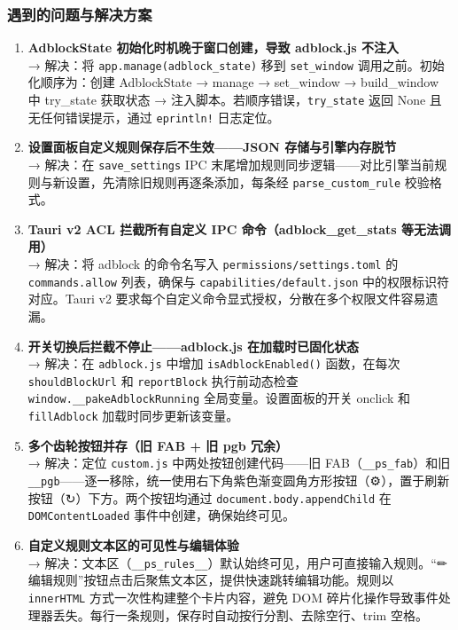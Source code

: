\documentclass[12pt,a4paper]{ctexart}
\begin{document}
\subsubsection{遇到的问题与解决方案}

\begin{enumerate}[label=(\arabic*)]
  \item \textbf{AdblockState 初始化时机晚于窗口创建，导致 adblock.js 不注入}
    \\→ 解决：将 \texttt{app.manage(adblock\_state)} 移到 \texttt{set\_window} 调用之前。初始化顺序为：创建 AdblockState → manage → set\_window → build\_window 中 try\_state 获取状态 → 注入脚本。若顺序错误，\texttt{try\_state} 返回 None 且无任何错误提示，通过 \texttt{eprintln!} 日志定位。

  \item \textbf{设置面板自定义规则保存后不生效——JSON 存储与引擎内存脱节}
    \\→ 解决：在 \texttt{save\_settings} IPC 末尾增加规则同步逻辑——对比引擎当前规则与新设置，先清除旧规则再逐条添加，每条经 \texttt{parse\_custom\_rule} 校验格式。

  \item \textbf{Tauri v2 ACL 拦截所有自定义 IPC 命令（adblock\_get\_stats 等无法调用）}
    \\→ 解决：将 adblock 的命令名写入 \texttt{permissions/settings.toml} 的 \texttt{commands.allow} 列表，确保与 \texttt{capabilities/default.json} 中的权限标识符对应。Tauri v2 要求每个自定义命令显式授权，分散在多个权限文件容易遗漏。

  \item \textbf{开关切换后拦截不停止——adblock.js 在加载时已固化状态}
    \\→ 解决：在 \texttt{adblock.js} 中增加 \texttt{isAdblockEnabled()} 函数，在每次 \texttt{shouldBlockUrl} 和 \texttt{reportBlock} 执行前动态检查 \texttt{window.\_\_pakeAdblockRunning} 全局变量。设置面板的开关 onclick 和 \texttt{fillAdblock} 加载时同步更新该变量。

  \item \textbf{多个齿轮按钮并存（旧 FAB + 旧 pgb 冗余）}
    \\→ 解决：定位 \texttt{custom.js} 中两处按钮创建代码——旧 FAB（\texttt{\_\_ps\_fab}）和旧 \texttt{\_\_pgb}——逐一移除，统一使用右下角紫色渐变圆角方形按钮（⚙），置于刷新按钮（↻）下方。两个按钮均通过 \texttt{document.body.appendChild} 在 \texttt{DOMContentLoaded} 事件中创建，确保始终可见。

  \item \textbf{自定义规则文本区的可见性与编辑体验}
    \\→ 解决：文本区（\texttt{\_\_ps\_rules\_\_}）默认始终可见，用户可直接输入规则。``✏ 编辑规则''按钮点击后聚焦文本区，提供快速跳转编辑功能。规则以 \texttt{innerHTML} 方式一次性构建整个卡片内容，避免 DOM 碎片化操作导致事件处理器丢失。每行一条规则，保存时自动按行分割、去除空行、trim 空格。
\end{enumerate}
\end{document}
